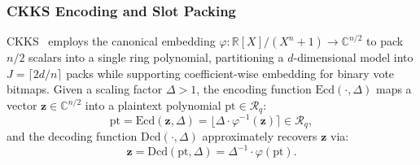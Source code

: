 \subsubsection{CKKS Encoding and Slot Packing}
CKKS~\cite{cheon2017homomorphic} employs the canonical embedding $\varphi: \mathbb{R}[X]/(X^n+1) \rightarrow \mathbb{C}^{n/2}$ to pack $n/2$ scalars into a single ring polynomial, partitioning a $d$-dimensional model into $J = \lceil 2d/n \rceil$ packs while supporting coefficient-wise embedding for binary vote bitmaps. Given a scaling factor $\Delta > 1$, the encoding function $\mathrm{Ecd}(\cdot, \Delta)$ maps a vector $\mathbf{z} \in \mathbb{C}^{n/2}$ into a plaintext polynomial $\mathrm{pt} \in \mathcal{R}_q$:
\begin{equation}
\mathrm{pt} = \mathrm{Ecd}(\mathbf{z}, \Delta) = \lfloor \Delta \cdot \varphi^{-1}(\mathbf{z}) \rceil \in \mathcal{R}_q,
\end{equation}
and the decoding function $\mathrm{Dcd}(\cdot, \Delta)$ approximately recovers $\mathbf{z}$ via:
\begin{equation}
\mathbf{z} = \mathrm{Dcd}(\mathrm{pt}, \Delta) = \Delta^{-1} \cdot \varphi(\mathrm{pt}).
\end{equation}

